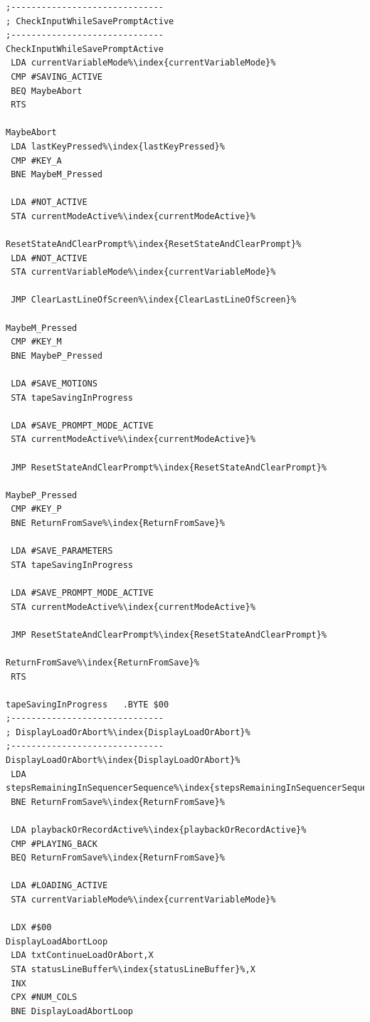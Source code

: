 \begin{minipage}[b]{0.33\linewidth}
\begin{lrbox}{\mybox}%
\begin{lstlisting}[basicstyle=\ttfamily\tiny,escapechar=\%]
;------------------------------
; CheckInputWhileSavePromptActive
;------------------------------
CheckInputWhileSavePromptActive
 LDA currentVariableMode%\index{currentVariableMode}%
 CMP #SAVING_ACTIVE
 BEQ MaybeAbort
 RTS

MaybeAbort
 LDA lastKeyPressed%\index{lastKeyPressed}%
 CMP #KEY_A
 BNE MaybeM_Pressed

 LDA #NOT_ACTIVE
 STA currentModeActive%\index{currentModeActive}%

ResetStateAndClearPrompt%\index{ResetStateAndClearPrompt}%
 LDA #NOT_ACTIVE
 STA currentVariableMode%\index{currentVariableMode}%

 JMP ClearLastLineOfScreen%\index{ClearLastLineOfScreen}%

MaybeM_Pressed
 CMP #KEY_M
 BNE MaybeP_Pressed

 LDA #SAVE_MOTIONS
 STA tapeSavingInProgress

 LDA #SAVE_PROMPT_MODE_ACTIVE
 STA currentModeActive%\index{currentModeActive}%

 JMP ResetStateAndClearPrompt%\index{ResetStateAndClearPrompt}%

MaybeP_Pressed
 CMP #KEY_P
 BNE ReturnFromSave%\index{ReturnFromSave}%

 LDA #SAVE_PARAMETERS
 STA tapeSavingInProgress

 LDA #SAVE_PROMPT_MODE_ACTIVE
 STA currentModeActive%\index{currentModeActive}%

 JMP ResetStateAndClearPrompt%\index{ResetStateAndClearPrompt}%

ReturnFromSave%\index{ReturnFromSave}%
 RTS

tapeSavingInProgress   .BYTE $00
;------------------------------
; DisplayLoadOrAbort%\index{DisplayLoadOrAbort}%
;------------------------------
DisplayLoadOrAbort%\index{DisplayLoadOrAbort}%
 LDA stepsRemainingInSequencerSequence%\index{stepsRemainingInSequencerSequence}%
 BNE ReturnFromSave%\index{ReturnFromSave}%

 LDA playbackOrRecordActive%\index{playbackOrRecordActive}%
 CMP #PLAYING_BACK
 BEQ ReturnFromSave%\index{ReturnFromSave}%

 LDA #LOADING_ACTIVE
 STA currentVariableMode%\index{currentVariableMode}%

 LDX #$00
DisplayLoadAbortLoop
 LDA txtContinueLoadOrAbort,X
 STA statusLineBuffer%\index{statusLineBuffer}%,X
 INX
 CPX #NUM_COLS
 BNE DisplayLoadAbortLoop


\end{lstlisting}
\end{lrbox}
\end{minipage}
